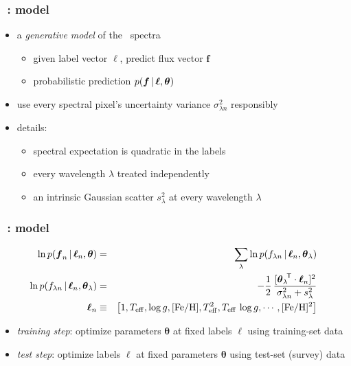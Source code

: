 \documentclass[pdftex]{beamer}
\begin{document}
\newcommand{\flux}{f}
\newcommand{\fluxes}{\boldsymbol{\flux}}
\newcommand{\labels}{\boldsymbol{\ell}}
\newcommand{\pars}{\boldsymbol{\theta}}

\begin{frame}
  \frametitle{\tc\ \credits: model}
  \begin{itemize}
  \item a \emph{generative model} of the \apogee\ spectra
    \begin{itemize}
    \item given label vector $\labels$, predict flux vector $\fluxes$
    \item probabilistic prediction $p(\fluxes\given\labels,\pars)$
    \end{itemize}
  \item use every spectral pixel's uncertainty variance $\sigma^2_{\lambda n}$ responsibly
  \item details:
    \begin{itemize}
    \item spectral expectation is quadratic in the labels
    \item every wavelength $\lambda$ treated independently
    \item an intrinsic Gaussian scatter $s^2_\lambda$ at every wavelength $\lambda$
    \end{itemize}
  \end{itemize}
\end{frame}

\begin{frame}
  \frametitle{\tc\ \credits: model}
  \begin{eqnarray}
    \ln p(\fluxes_n\given\labels_n,\pars) &=& \sum_\lambda \ln p(\flux_{\lambda n}\given\labels_n,\pars_\lambda) \\
    \ln p(\flux_{\lambda n}\given\labels_n,\pars_\lambda) &=& -\frac{1}{2}\,\frac{[\transpose{\pars_\lambda}\cdot\labels_n]^2}{\sigma^2_{\lambda n} + s^2_\lambda} \\
    \labels_n &\equiv& \left[1, \teff, \logg, \feh, \teff^2, \teff\,\logg, \cdots, \feh^2\right] \\
  \end{eqnarray}
  \begin{itemize}
  \item \emph{training step}: optimize parameters $\pars$ at fixed labels
    $\labels$ using training-set data
  \item \emph{test step}: optimize labels $\labels$ at fixed
    parameters $\pars$ using test-set (survey) data
  \end{itemize}
\end{frame}
\end{document}
